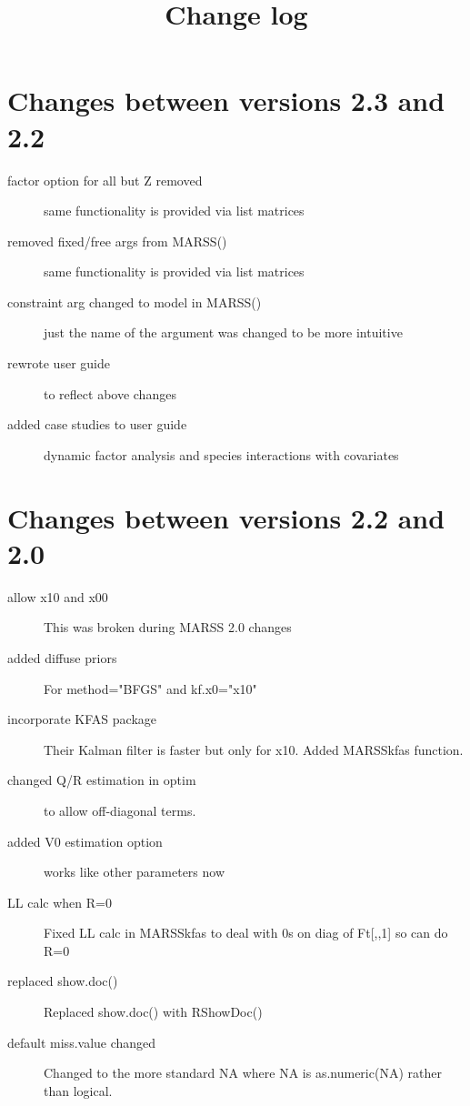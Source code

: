 \documentclass[12pt]{article}
\title{Change log}
\begin{document}
\section{Changes between versions 2.3 and 2.2}
\begin{description}
    \item[factor option for all but Z removed] same functionality is provided via list matrices
    \item[removed fixed/free args from MARSS()] same functionality is provided via list matrices
    \item[constraint arg changed to model in MARSS()] just the name of the argument was changed to be more intuitive
    \item[rewrote user guide] to reflect above changes
    \item[added case studies to user guide] dynamic factor analysis and species interactions with covariates
\end{description}

\section{Changes between versions 2.2 and 2.0}
\begin{description}
    \item[allow x10 and x00] This was broken during MARSS 2.0 changes
    \item[added diffuse priors] For method="BFGS" and kf.x0="x10"
    \item[incorporate KFAS package] Their Kalman filter is faster but only for x10.  Added MARSSkfas function.
    \item[changed Q/R estimation in optim] to allow off-diagonal terms.
    \item[added V0 estimation option] works like other parameters now
    \item[LL calc when R=0]Fixed LL calc in MARSSkfas to deal with 0s on diag of Ft[,,1] so can do R=0
    \item[replaced show.doc()]Replaced show.doc() with RShowDoc()
    \item[default miss.value changed] Changed to the more standard NA where NA is as.numeric(NA) rather than logical.
\end{description}
\end{document}
